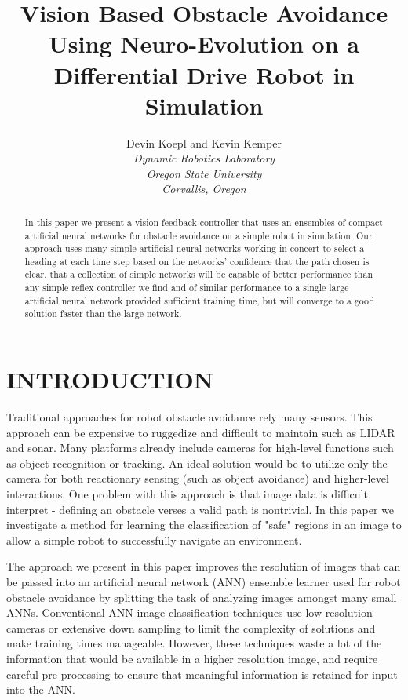 \documentclass{article}
\title{Vision Based Obstacle Avoidance Using Neuro-Evolution on a Differential Drive Robot in Simulation}
\author{ \parbox{3 in}{\centering Devin Koepl and Kevin Kemper\\
	\medskip
	\small{\textit{Dynamic Robotics Laboratory\\
	Oregon State University\\
	Corvallis, Oregon}}}
}
\begin{document}
	\maketitle

	\begin{abstract}

		In this paper we present a vision feedback controller that uses an ensembles of compact artificial neural networks for obstacle avoidance on a simple robot in simulation. Our approach uses many simple artificial neural networks working in concert to select a heading at each time step based on the networks' confidence that the path chosen is clear.  that a collection of simple networks will be capable of better performance than any simple reflex controller we find and of similar performance to a single large artificial neural network provided sufficient training time, but will converge to a good solution faster than the large network.

	\end{abstract}


	\section{INTRODUCTION}
			
		Traditional approaches for robot obstacle avoidance rely many sensors.  This approach can be expensive to ruggedize and difficult to maintain such as LIDAR and sonar.  Many platforms already include cameras for high-level functions such as object recognition or tracking. An ideal solution would be to utilize only the camera for both reactionary sensing (such as object avoidance) and higher-level interactions.  One problem with this approach is that image data is difficult interpret - defining an obstacle verses a valid path is nontrivial.  In this paper we investigate a method for learning the classification of "safe" regions in an image to allow a simple robot to successfully navigate an environment.
		
		The approach we present in this paper improves the resolution of images that can be passed into an artificial neural network (ANN) ensemble learner used for robot obstacle avoidance by splitting the task of analyzing images amongst many small ANNs.  Conventional ANN image classification techniques use low resolution cameras or extensive down sampling to limit the complexity of solutions and make training times manageable.  However, these techniques waste a lot of the information that would be available in a higher resolution image, and require careful pre-processing to ensure that meaningful information is retained for input into the ANN.
\end{document}
